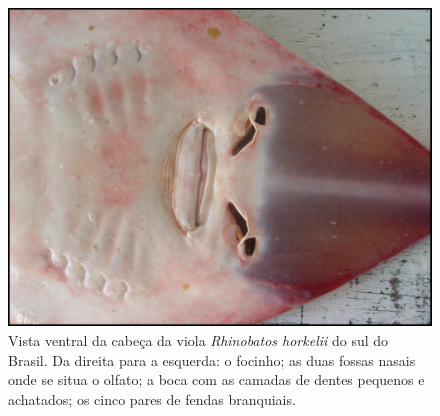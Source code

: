 \documentclass[a4paper,11pt,twoside,showtrims,onecolumn,openright,final]{memoir}
\begin{document}
\begin{figure}
\begin{center}
\includegraphics[width=\textwidth]{VIOLA_VISTA_VENTRAL}
\end{center}
\caption[Vista ventral da cabeça da viola \emph{Rhinobatos horkelii} do sul do Brasil]
	{Vista ventral da cabeça da viola \emph{Rhinobatos horkelii} do sul do Brasil. 
         Da direita para a esquerda: o focinho; as duas fossas nasais onde se situa o olfato; a boca com as 
         camadas de dentes pequenos e achatados; os cinco pares de fendas branquiais.}
\label{fig:viola-vistaventral}
\end{figure}




%
%
\end{document}

